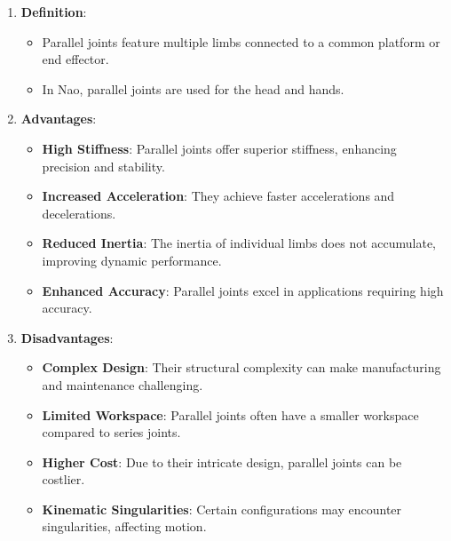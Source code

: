\documentclass[conference]{IEEEtran}
\begin{document}
\begin{enumerate}
    \item \textbf{Definition}:
        \begin{itemize}
            \item Parallel joints feature multiple limbs connected to a common platform or end effector.
            \item In Nao, parallel joints are used for the head and hands.
        \end{itemize}
    \item \textbf{Advantages}:
        \begin{itemize}
            \item \textbf{High Stiffness}: Parallel joints offer superior stiffness, enhancing precision and stability.
            \item \textbf{Increased Acceleration}: They achieve faster accelerations and decelerations.
            \item \textbf{Reduced Inertia}: The inertia of individual limbs does not accumulate, improving dynamic performance.
            \item \textbf{Enhanced Accuracy}: Parallel joints excel in applications requiring high accuracy.
        \end{itemize}
    \item \textbf{Disadvantages}:
        \begin{itemize}
            \item \textbf{Complex Design}: Their structural complexity can make manufacturing and maintenance challenging.
            \item \textbf{Limited Workspace}: Parallel joints often have a smaller workspace compared to series joints.
            \item \textbf{Higher Cost}: Due to their intricate design, parallel joints can be costlier.
            \item \textbf{Kinematic Singularities}: Certain configurations may encounter singularities, affecting motion.
        \end{itemize}
\end{enumerate}
\end{document}
